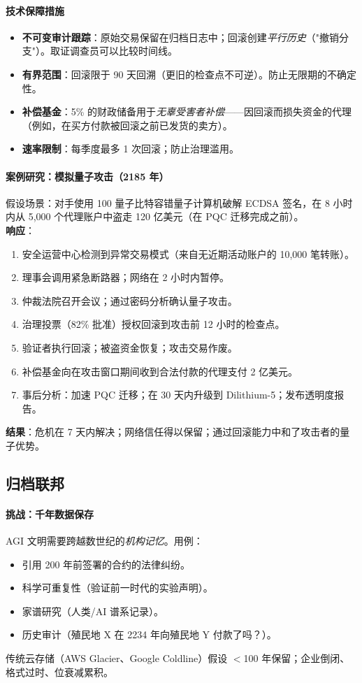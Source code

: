 \documentclass[11pt]{article}
\begin{document}
\paragraph{技术保障措施}
\begin{itemize}[noitemsep]
  \item \textbf{不可变审计跟踪}：原始交易保留在归档日志中；回滚创建\emph{平行历史}（"撤销分支"）。取证调查员可以比较时间线。
  \item \textbf{有界范围}：回滚限于 90 天回溯（更旧的检查点不可逆）。防止无限期的不确定性。
  \item \textbf{补偿基金}：5\% 的财政储备用于\emph{无辜受害者补偿}——因回滚而损失资金的代理（例如，在买方付款被回滚之前已发货的卖方）。
  \item \textbf{速率限制}：每季度最多 1 次回滚；防止治理滥用。
\end{itemize}

\paragraph{案例研究：模拟量子攻击（2185 年）}
假设场景：对手使用 100 量子比特容错量子计算机破解 ECDSA 签名，在 8 小时内从 5,000 个代理账户中盗走 120 亿美元（在 PQC 迁移完成之前）。\\
\textbf{响应}：
\begin{enumerate}[noitemsep]
  \item 安全运营中心检测到异常交易模式（来自无近期活动账户的 10,000 笔转账）。
  \item 理事会调用紧急断路器；网络在 2 小时内暂停。
  \item 仲裁法院召开会议；通过密码分析确认量子攻击。
  \item 治理投票（82\% 批准）授权回滚到攻击前 12 小时的检查点。
  \item 验证者执行回滚；被盗资金恢复；攻击交易作废。
  \item 补偿基金向在攻击窗口期间收到合法付款的代理支付 2 亿美元。
  \item 事后分析：加速 PQC 迁移；在 30 天内升级到 Dilithium-5；发布透明度报告。
\end{enumerate}
\textbf{结果}：危机在 7 天内解决；网络信任得以保留；通过回滚能力中和了攻击者的量子优势。

\subsection{归档联邦}

\paragraph{挑战：千年数据保存}
AGI 文明需要跨越数世纪的\emph{机构记忆}。用例：
\begin{itemize}[noitemsep]
  \item 引用 200 年前签署的合约的法律纠纷。
  \item 科学可重复性（验证前一时代的实验声明）。
  \item 家谱研究（人类/AI 谱系记录）。
  \item 历史审计（殖民地 X 在 2234 年向殖民地 Y 付款了吗？）。
\end{itemize}
传统云存储（AWS Glacier、Google Coldline）假设 $<$100 年保留；企业倒闭、格式过时、位衰减累积。
\end{document}
